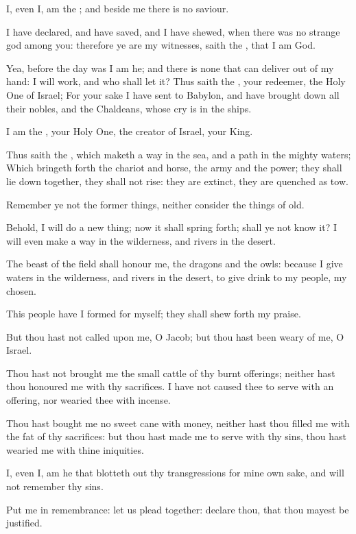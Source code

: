 \verse I, even I, am the \LORD; and beside me there is no saviour.

\verse I have declared, and have saved, and I have shewed, when there was no strange god among you: therefore ye are my witnesses, saith the \LORD, that I am God.

\verse Yea, before the day was I am he; and there is none that can deliver out of my hand: I will work, and who shall let it?  \verse Thus saith the \LORD, your redeemer, the Holy One of Israel; For your sake I have sent to Babylon, and have brought down all their nobles, and the Chaldeans, whose cry is in the ships.

\verse I am the \LORD, your Holy One, the creator of Israel, your King.

\verse Thus saith the \LORD, which maketh a way in the sea, and a path in the mighty waters; \verse Which bringeth forth the chariot and horse, the army and the power; they shall lie down together, they shall not rise: they are extinct, they are quenched as tow.

\verse Remember ye not the former things, neither consider the things of old.

\verse Behold, I will do a new thing; now it shall spring forth; shall ye not know it? I will even make a way in the wilderness, and rivers in the desert.

\verse The beast of the field shall honour me, the dragons and the owls: because I give waters in the wilderness, and rivers in the desert, to give drink to my people, my chosen.

\verse This people have I formed for myself; they shall shew forth my praise.

\verse But thou hast not called upon me, O Jacob; but thou hast been weary of me, O Israel.

\verse Thou hast not brought me the small cattle of thy burnt offerings; neither hast thou honoured me with thy sacrifices. I have not caused thee to serve with an offering, nor wearied thee with incense.

\verse Thou hast bought me no sweet cane with money, neither hast thou filled me with the fat of thy sacrifices: but thou hast made me to serve with thy sins, thou hast wearied me with thine iniquities.

\verse I, even I, am he that blotteth out thy transgressions for mine own sake, and will not remember thy sins.

\verse Put me in remembrance: let us plead together: declare thou, that thou mayest be justified.

